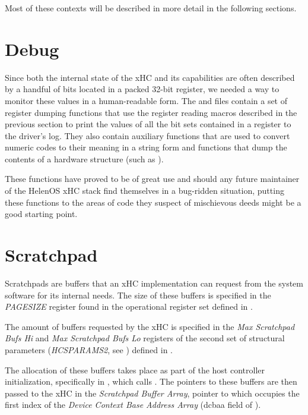 Most of these contexts will be described in more detail in the following sections.

\section{Debug}

Since both the internal state of the xHC and its capabilities are often described by
a handful of bits located in a packed 32-bit register, we needed a way to monitor these
values in a human-readable form. The  and
 files contain a set of register dumping
functions that use the register reading macros described in the previous section to print
the values of all the bit sets contained in a register to the driver's log. They also contain
auxiliary functions that are used to convert numeric codes to their meaning in a string form and
functions that dump the contents of a hardware structure (such as ).

These functions have proved to be of great use and should any future maintainer of the
HelenOS xHC stack find themselves in a bug-ridden situation, putting these functions to
the areas of code they suspect of mischievous deeds might be a good starting point.



\section{Scratchpad}
\label{sec:scratchpads}

Scratchpads are buffers that an xHC implementation can request from the system software
for its internal needs. The size of these buffers is specified in the \textit{PAGESIZE} register
found in the operational register set defined in .

The amount of buffers requested by the xHC is specified in the \textit{Max Scratchpad Bufs Hi} and
\textit{Max Scratchpad Bufs Lo} registers of the second set of structural parameters (\textit{HCSPARAMS2},
see ) defined in .

The allocation of these buffers takes place as part of the host controller initialization,
specifically in , which calls . The pointers
to these buffers are then passed to the xHC in the \textit{Scratchpad Buffer Array}, pointer to which
occupies the first index of the \textit{Device Context Base Address Array} (dcbaa field of
).

